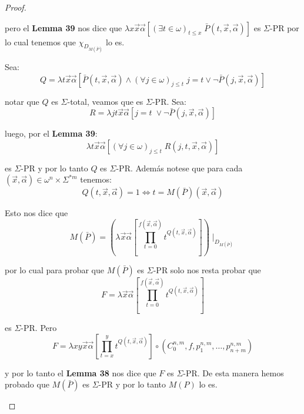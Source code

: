 \begin{proof}
\begin{enumerate}[a)]
        \PN pero el \textbf{Lemma 39} nos dice que $\lambda x\vec{x}\vec{\alpha} \left[(\exists t \in \omega)_{t\leq x}
        \; \bar{P}(t,\vec{x},\vec{\alpha})\right]$ es $\Sigma$-PR por lo cual tenemos que $\chi_{D_{M(\bar{P})}}$ lo es.

        \PN Sea:
        \[
          Q = \lambda t\vec{x}\vec{\alpha}\left[\bar{P}(t,\vec{x},\vec{\alpha}) \wedge (\forall j \in \omega)_{j \leq t}
          \; j=t \vee \lnot \bar{P}(j,\vec{x},\vec{\alpha})\right]
        \]

        \PN notar que $Q$ es $\Sigma$-total, veamos que es $\Sigma$-PR. Sea:
        \[
          R = \lambda jt\vec{x}\vec{\alpha} \left[j=t \; \vee \neg \bar{P}(j,\vec{x},\vec{\alpha})\right]
        \]

        \PN luego, por el \textbf{Lemma 39}:
        \[
          \lambda t\vec{x}\vec{\alpha} \left[(\forall j \in \omega)_{j \leq t} \; R(j,t,\vec{x},\vec{\alpha})\right]
        \]

        \PN es $\Sigma$-PR y por lo tanto $Q$ es $\Sigma$-PR. Además notese que para cada $(\vec{x},\vec{\alpha}) \in
        \omega^{n} \times \Sigma^{\ast m}$ tenemos:
        \[
          Q(t,\vec{x},\vec{\alpha}) = 1 \Leftrightarrow t = M(\bar{P})(\vec{x},\vec{\alpha})
        \]

        \PN Esto nos dice que
        \[
          M(\bar{P}) = \left(\lambda \vec{x}\vec{\alpha}\left[\prod_{t=0}^{f(\vec{x},\vec{\alpha})}t^{Q(t,\vec{x},
          \vec{\alpha})}\right]\right) \mid_{D_{M(\bar{P})}}
        \]

        \PN por lo cual para probar que $M(\bar{P})$ es $\Sigma$-PR solo nos resta probar que
        \[
          F = \lambda \vec{x}\vec{\alpha}\left[\prod_{t=0}^{f(\vec{x},\vec{\alpha})}t^{Q(t,\vec{x},\vec{\alpha})}
          \right]
        \]

        \PN es $\Sigma$-PR. Pero
        \[
          F = \lambda xy\vec{x}\vec{\alpha}\left[\prod_{t=x}^{y}t^{Q(t,\vec{x},\vec{\alpha})}\right] \circ
          (C_{0}^{n,m},f,p_{1}^{n,m},\dotsc,p_{n+m}^{n,m})
        \]

        \PN y por lo tanto el \textbf{Lemma 38} nos dice que $F$ es $\Sigma$-PR. De esta manera hemos probado que
        $M(\bar{P})$ es $\Sigma$-PR y por lo tanto $M(P)$ lo es.
    \end{enumerate}
  \end{proof}

